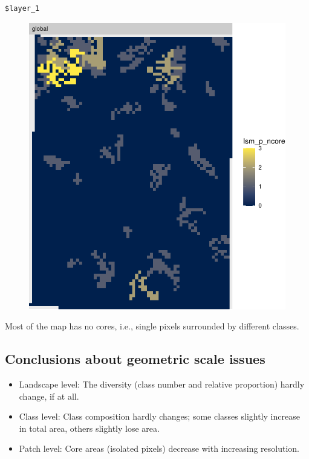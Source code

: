 \documentclass[
  letterpaper,
  DIV=11,
  numbers=noendperiod]{scrartcl}
\begin{document}
\begin{verbatim}
$layer_1
\end{verbatim}

\begin{figure}[H]

{\centering \includegraphics{PatternAnalysisWorkshopTutorial_files/figure-pdf/show-ncore-300-1.pdf}

}

\end{figure}

Most of the map has no cores, i.e., single pixels surrounded by
different classes.

\hypertarget{conclusions-about-geometric-scale-issues}{%
\subsection{Conclusions about geometric scale
issues}\label{conclusions-about-geometric-scale-issues}}

\begin{itemize}
\item
  Landscape level: The diversity (class number and relative proportion)
  hardly change, if at all.
\item
  Class level: Class composition hardly changes; some classes slightly
  increase in total area, others slightly lose area.
\item
  Patch level: Core areas (isolated pixels) decrease with increasing
  resolution.
\end{itemize}
\end{document}
